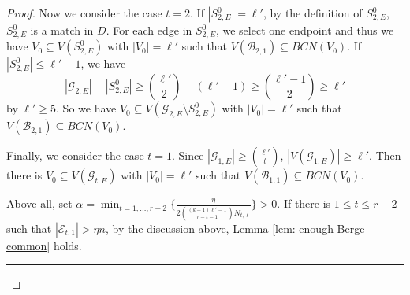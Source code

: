 \documentclass[10pt,a4paper]{amsart}
\def\q{\hfill\rule{1ex}{1ex}}
\newcommand{\mg}{\mathcal{G}}
\begin{document}
\begin{proof}
     Now we consider the case $t=2$. If $|S_{2,E}^{0}|=\ell'$, by the definition of $S_{2,E}^{0}$, $S_{2,E}^{0}$ is a match  in $D$. For each edge in $S_{2,E}^{0}$, we select one endpoint and thus we have  $V_0\subseteq V(S_{2,E}^{0})$ with $|V_0|= \ell'$ such that $V(\mathcal{B}_{2,1})\subseteq BCN(V_0)$. If $|S_{2,E}^{0}|\leq \ell'-1$, we have
     $$|\mg_{2,E}|-|S_{2,E}^{0}|\geq\binom{\ell'}{2}-(\ell'-1)\geq \binom{\ell'-1}{2}\ge \ell'$$ by $\ell'\ge 5$.
     So we have  $V_0\subseteq V(\mg_{2,E}\setminus S_{2,E}^{0})$ with $|V_0|= \ell'$ such that $V(\mathcal{B}_{2,1})\subseteq BCN(V_0)$.

     Finally, we consider the case $t=1$. Since $|\mg_{1,E}|\geq \binom{\ell'}{t}$,  $|V(\mg_{1,E})|\ge \ell'$. Then there is $V_0\subseteq V(\mg_{t,E})$ with $|V_0|= \ell'$ such that $V(\mathcal{B}_{1,1})\subseteq BCN(V_0)$.
     \par
     Above all, set $\alpha=\min_{t=1,\ldots,r-2}\{\frac{\eta}{2\binom{(k-1)\ell'-1}{r-t-1} N_{t,\ell}}\}>0$. If there is $1\le t\le r-2$ such that
 $|\mathcal{E}_{t,1}|>\eta n$, by the  discussion above, Lemma \ref{lem: enough Berge common} holds.\q


\end{proof}
\end{document}
